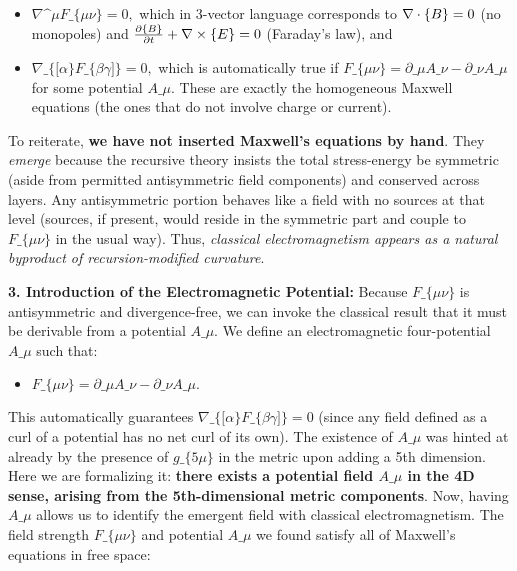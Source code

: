 \documentclass[]{article}
\begin{document}
\begin{itemize}
\item
  $\nabla\^{}\mu
  F\_\{\mu\nu\} = 0,$ which in 3-vector
  language corresponds to $\nabla\cdot
  \mathbf\{B\} = 0$ (no monopoles) and
  $\frac{\partial
  \mathbf\{B\}}{\partial t} +
  \nabla \times
  \mathbf\{E\} = 0$ (Faraday's law), and
\item
  $\nabla\_\{{[}\alpha\}F\_\{\beta\gamma{]}\}
  = 0,$ which is automatically true if
  $F\_\{\mu\nu\} =
  \partial\_\mu A\_\nu -
  \partial\_\nu A\_\mu$
  for some potential $A\_\mu$. These are exactly the
  homogeneous Maxwell equations (the ones that do not involve charge or
  current)​.
\end{itemize}

To reiterate, \textbf{we have not inserted Maxwell's equations by hand}.
They \emph{emerge} because the recursive theory insists the total
stress-energy be symmetric (aside from permitted antisymmetric field
components) and conserved across layers. Any antisymmetric portion
behaves like a field with no sources at that level (sources, if present,
would reside in the symmetric part and couple to
$F\_\{\mu\nu\}$ in the usual way). Thus,
\emph{classical electromagnetism appears as a natural byproduct of
recursion-modified curvature}​.

\textbf{3. Introduction of the Electromagnetic Potential:} Because
$F\_\{\mu\nu\}$ is antisymmetric and
divergence-free, we can invoke the classical result that it must be
derivable from a potential $A\_\mu$. We define an
electromagnetic four-potential $A\_\mu$ such that:

\begin{itemize}
\item
  $F\_\{\mu\nu\} =
  \partial\_\mu A\_\nu -
  \partial\_\nu A\_\mu.$
\end{itemize}

This automatically guarantees
$\nabla\_\{{[}\alpha\}F\_\{\beta\gamma{]}\}=0$
(since any field defined as a curl of a potential has no net curl of its
own). The existence of $A\_\mu$ was hinted at already
by the presence of $g\_\{5\mu\}$ in the metric upon
adding a 5th dimension. Here we are formalizing it: \textbf{there exists
a potential field $A\_\mu$ in the 4D sense, arising
from the 5th-dimensional metric components}​. Now, having
$A\_\mu$ allows us to identify the emergent field with
classical electromagnetism. The field strength
$F\_\{\mu\nu\}$ and potential
$A\_\mu$ we found satisfy all of Maxwell's equations in
free space:
\end{document}
